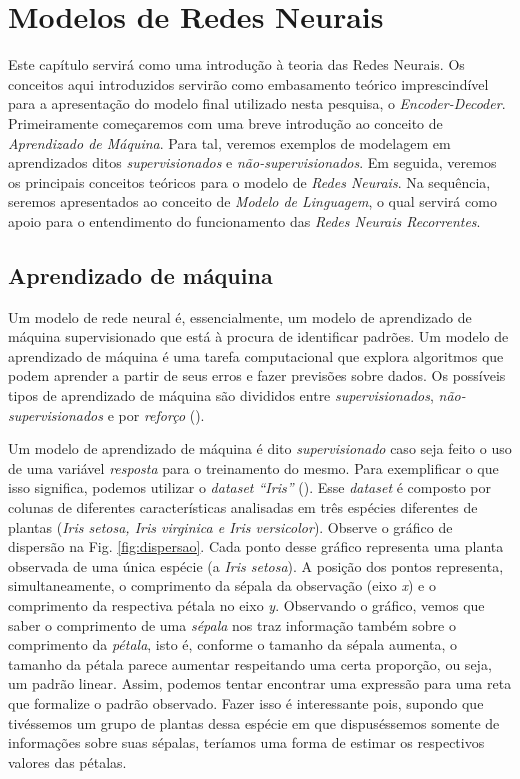 \chapter{Modelos de Redes Neurais}
\label{ch:03}



Este capítulo servirá como uma introdução à teoria das Redes Neurais. Os conceitos aqui introduzidos servirão como embasamento teórico imprescindível para a apresentação do modelo final utilizado nesta pesquisa, o \textit{Encoder-Decoder}. Primeiramente começaremos com uma breve introdução ao conceito de \textit{Aprendizado de Máquina}. Para tal, veremos exemplos de modelagem em aprendizados ditos \textit{supervisionados} e \textit{não-supervisionados}. Em seguida, veremos os principais conceitos teóricos para o modelo de \textit{Redes Neurais}. Na sequência, seremos apresentados ao conceito de \textit{Modelo de Linguagem}, o qual servirá como apoio para o entendimento do funcionamento das \textit{Redes Neurais Recorrentes}.

\section{Aprendizado de máquina}
\label{sec:ml}

Um modelo de rede neural é, essencialmente, um modelo de aprendizado de máquina supervisionado
que está à procura de identificar padrões. Um modelo de aprendizado de máquina é uma tarefa computacional que explora algoritmos que podem aprender a partir de seus erros e fazer previsões sobre dados. Os possíveis tipos de aprendizado de máquina são divididos entre \textit{supervisionados}, \textit{não-supervisionados}
e por \textit{reforço} (\cite{Gron:2017}). 

Um modelo de aprendizado de máquina é dito \textit{supervisionado} caso seja feito o uso de uma variável \textit{resposta} para o treinamento do mesmo. Para exemplificar o que isso significa, podemos utilizar o \textit{dataset “Iris”} (\cite{Dua:2019}). Esse \textit{dataset} é composto por colunas de diferentes características analisadas em três espécies diferentes de plantas (\textit{Iris setosa, Iris virginica e Iris versicolor}). Observe o gráfico de dispersão na Fig. \ref{fig:dispersao}. Cada ponto desse gráfico representa uma planta observada de uma única espécie (a \textit{Iris setosa}). A posição dos pontos representa, simultaneamente, o comprimento da sépala da observação (eixo \textit{x}) e o comprimento da respectiva pétala no eixo \textit{y}. Observando o gráfico, vemos que saber o comprimento de uma \textit{sépala} nos traz informação também sobre o comprimento da \textit{pétala}, isto é, conforme o tamanho da sépala aumenta, o tamanho da pétala parece aumentar respeitando uma certa proporção, ou seja, um padrão linear. Assim, podemos tentar encontrar uma expressão para uma reta que formalize o padrão observado. Fazer isso é interessante pois, supondo que tivéssemos um grupo de plantas dessa espécie em que dispuséssemos somente de informações sobre suas sépalas, teríamos uma forma de estimar os respectivos valores das pétalas.


